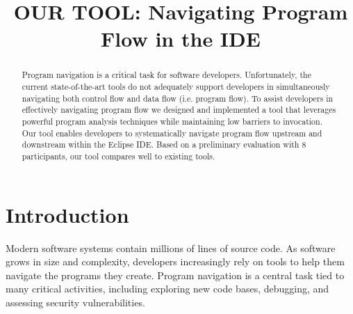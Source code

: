 \documentclass[conference]{IEEEtran}
\newcommand{\toolName}{OUR TOOL}
\begin{document}
%
\title{\toolName: Navigating Program Flow in the IDE}


\author{
}

\maketitle

\begin{abstract}
Program navigation is a critical task for software developers. 
Unfortunately, the current state-of-the-art tools do not adequately support developers in simultaneously navigating both control flow and data flow (i.e. program flow). 
To assist developers in effectively navigating program flow we designed and implemented a tool that leverages powerful program analysis techniques while maintaining low barriers to invocation.
Our tool enables developers to systematically navigate program flow upstream and downstream within the Eclipse IDE.
Based on a preliminary evaluation with 8 participants, our tool compares well to existing tools. 
\end{abstract}




\IEEEpeerreviewmaketitle


\section{Introduction}
Modern software systems contain millions of lines of source code. 
As software grows in size and complexity, developers increasingly rely on tools to help them navigate the programs they create. 
Program navigation is a central task tied to many critical activities, including exploring new code bases, debugging, and assessing security vulnerabilities. 
\end{document}
